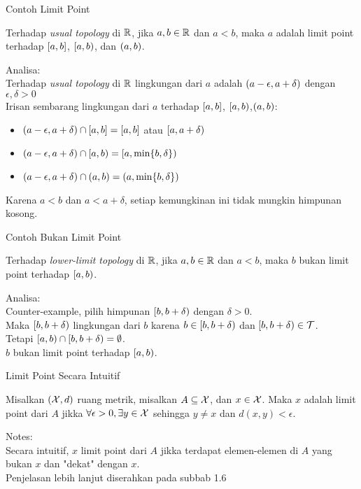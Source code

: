 \begin{frame}{Contoh Limit Point}
    \begin{tcolorbox}[enhanced,title=Contooh 41 (a), frame style tile={width=\paperwidth}{\wallpaper}]
        Terhadap \textit{usual topology} di $\mathbb{R}$, jika $a,b\in\mathbb{R}$ dan $a<b$,
        maka $a$ adalah limit point terhadap $[a,b]$, $[a,b)$, dan $(a,b)$.
    \end{tcolorbox}
Analisa: \\
Terhadap \textit{usual topology} di $\mathbb{R}$ lingkungan dari $a$ adalah 
$(a-\epsilon,a+\delta)$ dengan $\epsilon,\delta > 0$\\
Irisan sembarang lingkungan dari $a$ terhadap $[a,b]$, $[a,b)$,$(a,b)$:
\begin{itemize}
    \item $(a-\epsilon,a+\delta)\cap[a,b] = [a,b]$ atau $[a,a+\delta)$
    \item $(a-\epsilon,a+\delta)\cap[a,b) = [a,\min\{b,\delta\})$
    \item $(a-\epsilon,a+\delta)\cap(a,b) = (a,\min\{b,\delta\})$
\end{itemize}
Karena $a<b$ dan $a<a+\delta$, setiap kemungkinan ini tidak mungkin himpunan kosong.
\end{frame}

\begin{frame}{Contoh Bukan Limit Point}
    \begin{tcolorbox}[enhanced,title=Contooh 41 (b), frame style tile={width=\paperwidth}{\wallpaper}]
        Terhadap \textit{lower-limit topology} di $\mathbb{R}$, jika $a,b\in\mathbb{R}$ dan $a<b$,
        maka $b$ bukan limit point terhadap $[a,b)$.
    \end{tcolorbox}
Analisa: \\
Counter-example, pilih himpunan $[b,b+\delta)$ dengan $\delta > 0$. \\
Maka $[b,b+\delta)$ lingkungan dari $b$ karena $b\in[b,b+\delta)$ 
dan $[b,b+\delta)\in \mathcal{T}$.\\
Tetapi $[a,b)\cap[b,b+\delta)=\emptyset$.\\
$b$ bukan limit point terhadap $[a,b)$.
\end{frame}

\begin{frame}{Limit Point Secara Intuitif}
    \begin{tcolorbox}[enhanced,title=Contoh 42, frame style tile={width=\paperwidth}{\wallpaper}]
        Misalkan $(\mathcal{X},d)$ ruang metrik, misalkan $A\subseteq \mathcal{X}$, dan $x\in\mathcal{X}$.
        Maka $x$ adalah limit point dari $A$ jikka $\forall \epsilon>0, \exists y\in\mathcal{X}$ 
        sehingga $y\neq x$ dan $d(x,y)<\epsilon$.
    \end{tcolorbox}
Notes:\\
Secara intuitif, $x$ limit point dari $A$ jikka terdapat elemen-elemen di $A$ yang 
bukan $x$ dan "dekat" dengan $x$.\\
Penjelasan lebih lanjut diserahkan pada subbab 1.6
\end{frame}
